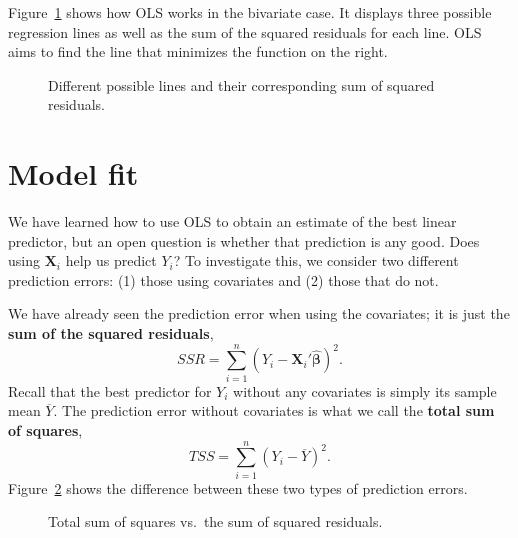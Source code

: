 \documentclass[
  13pt,
  letterpaper,
  DIV=11,
  numbers=noendperiod]{scrreprt}
\newcommand{\mb}{\symbf}
\newcommand{\X}{\mb{X}}
\newcommand{\bhat}{\widehat{\mb{\beta}}}
\theoremstyle{plain}
\theoremstyle{definition}
\theoremstyle{definition}
\theoremstyle{remark}
\begin{document}
Figure~\ref{fig-ssr-comp} shows how OLS works in the bivariate case. It
displays three possible regression lines as well as the sum of the
squared residuals for each line. OLS aims to find the line that
minimizes the function on the right.

\begin{figure}[th]


\caption{\label{fig-ssr-comp}Different possible lines and their
corresponding sum of squared residuals.}

\end{figure}%

\section{Model fit}\label{model-fit}

We have learned how to use OLS to obtain an estimate of the best linear
predictor, but an open question is whether that prediction is any good.
Does using \(\X_i\) help us predict \(Y_i\)? To investigate this, we
consider two different prediction errors: (1) those using covariates and
(2) those that do not.

We have already seen the prediction error when using the covariates; it
is just the \textbf{sum of the squared residuals}, \[ 
SSR = \sum_{i=1}^n (Y_i - \X_{i}'\bhat)^2.
\] Recall that the best predictor for \(Y_i\) without any covariates is
simply its sample mean \(\overline{Y}\). The prediction error without
covariates is what we call the \textbf{total sum of squares}, \[ 
TSS = \sum_{i=1}^n (Y_i - \overline{Y})^2.
\] Figure~\ref{fig-ssr-vs-tss} shows the difference between these two
types of prediction errors.

\begin{figure}[th]


\caption{\label{fig-ssr-vs-tss}Total sum of squares vs.~the sum of
squared residuals.}

\end{figure}%
\end{document}
